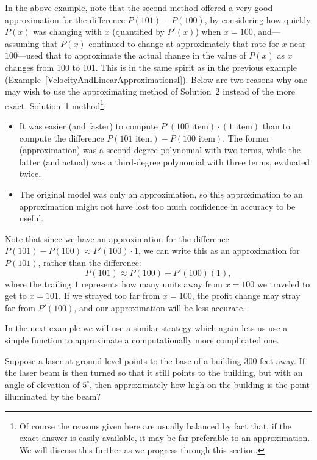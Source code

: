In the above example, note that the second method 
offered a very good approximation for the difference
$P(101)-P(100)$, by considering how quickly $P(x)$
was changing with $x$ (quantified by $P'(x)$)
when $x=100$, and---assuming that $P(x)$ continued
to change at approximately that rate for $x$ near $100$---used
that to approximate the actual change in the value 
of $P(x)$ as $x$ changes from 100 to 101.  This is in the
same spirit as in the previous example
(Example~\ref{VelocityAndLinearApproximationsI}).  Below are two
reasons why one may wish to use the approximating method
of Solution~2 instead of the more exact, Solution~1 method\footnote{%
Of course the reasons given here are usually balanced by
fact that, if the exact answer is easily available,
it may be far preferable to an approximation.  We will
discuss this further as we progress through this section.
}:
\begin{itemize}
\item It was easier (and faster) to compute $P'(100\text{ item})
        \cdot (1\text{ item})$
       than to compute the difference
      $P(101\text{ item})-P(100\text{ item})$.  The former
      (approximation) was
      a second-degree polynomial with two terms,
      while the latter (and actual) was a third-degree polynomial
       with three terms, evaluated twice.
\item The original model was only an approximation, so  this
      approximation to an approximation might not have lost
      too much confidence in accuracy to be useful.
\end{itemize}
Note that since we have an approximation for the difference
$P(101)-P(100)\approx P'(100)\cdot 1$, we can write this
as an approximation for $P(101)$, rather than the difference:
$$P(101)\approx P(100)+P'(100)(1),$$
where the trailing $1$ represents how many units away from
$x=100$ we traveled to get to $x=101$.  If we strayed too far
from $x=100$, the profit change may stray far from $P'(100)$,
and our approximation will be less accurate.

In the next example we will use a similar strategy which
again lets us use a simple function to approximate a 
computationally more complicated one.

\bex Suppose a laser at ground level points to the 
     base of a building 300 feet away.  If the laser
     beam is then turned so that it still points to the 
     building, but with an angle of elevation of $5^\circ$,
     then approximately how high on the building
     is the point illuminated by the beam?


